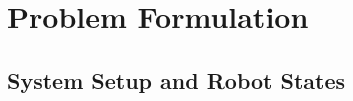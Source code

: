 
\section{Problem Formulation}
\label{sec:formulation}

\subsection{System Setup and Robot States}

